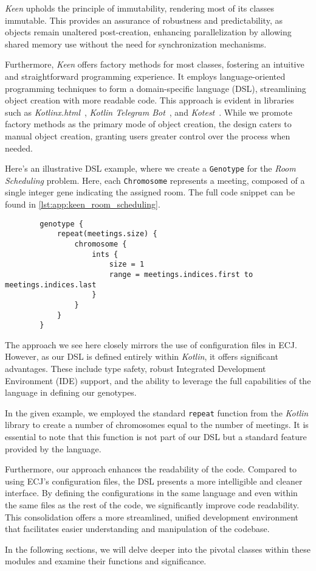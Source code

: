     \textit{Keen} upholds the principle of immutability, rendering most of its classes immutable.
    This provides an assurance of robustness and predictability, as objects remain unaltered post-creation, enhancing parallelization by allowing shared memory use without the need for synchronization mechanisms.

    Furthermore, \textit{Keen} offers factory methods for most classes, fostering an intuitive and straightforward programming experience.
    It employs language-oriented programming techniques to form a domain-specific language (DSL), streamlining object creation with more readable code.
    This approach is evident in libraries such as \textit{Kotlinx.html}~\autocite{KotlinxHtml2023}, \textit{Kotlin Telegram Bot}~\autocite{KotlinTelegramBot2023}, and \textit{Kotest}~\autocite{KotestKotesta}.
    While we promote factory methods as the primary mode of object creation, the design caters to manual object creation, granting users greater control over the process when needed.


    Here's an illustrative DSL example, where we create a \texttt{Genotype} for the \textit{Room Scheduling} problem.
    Here, each \texttt{Chromosome} represents a meeting, composed of a single integer gene indicating the assigned room.
    The full code snippet can be found in \vref{lst:app:keen_room_scheduling}.

    \begin{verbatim}
        genotype {
            repeat(meetings.size) {
                chromosome {
                    ints { 
                        size = 1
                        range = meetings.indices.first to meetings.indices.last 
                    }
                }
            }
        }
    \end{verbatim}

    The approach we see here closely mirrors the use of configuration files in 
    ECJ.
    However, as our DSL is defined entirely within \textit{Kotlin}, it offers 
    significant advantages.
    These include type safety, robust Integrated Development Environment (IDE) 
    support, and the ability to leverage the full capabilities of the language 
    in defining our genotypes.

    In the given example, we employed the standard \texttt{repeat} function 
    from the \textit{Kotlin} library to create a number of chromosomes equal to 
    the number of meetings.
    It is essential to note that this function is not part of our DSL but a 
    standard feature provided by the language.

    Furthermore, our approach enhances the readability of the code.
    Compared to using ECJ's configuration files, the DSL presents a more 
    intelligible and cleaner interface.
    By defining the configurations in the same language and even within the 
    same files as the rest of the code, we significantly improve code 
    readability.
    This consolidation offers a more streamlined, unified development 
    environment that facilitates easier understanding and manipulation of the 
    codebase.

    In the following sections, we will delve deeper into the pivotal classes within these modules and examine their functions and significance.
